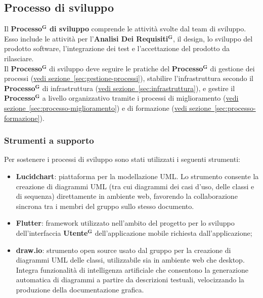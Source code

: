 \documentclass[a4paper,12pt]{article}
\newcommand{\term}[1]{\textbf{#1}$^\mathbf{G}$}
\begin{document}
\subsection{Processo di sviluppo} \label{sec:processo-sviluppo}
Il \textbf{\term{Processo} di sviluppo} comprende le attività svolte dal team di sviluppo. Esso include le attività per l'\term{Analisi Dei Requisiti}, il design, lo sviluppo del prodotto software, l'integrazione dei test e l'accettazione del prodotto da rilasciare.
\\Il \term{Processo} di sviluppo deve seguire le pratiche del \term{Processo} di gestione dei processi (\hyperref[sec:gestione-processi]{vedi sezione~\ref*{sec:gestione-processi}}), stabilire l'infrastruttura secondo il \term{Processo} di infrastruttura (\hyperref[sec:infrastruttura]{vedi sezione~\ref*{sec:infrastruttura}}), e gestire il \term{Processo} a livello organizzativo tramite i processi di miglioramento (\hyperref[sec:processo-miglioramento]{vedi sezione~\ref*{sec:processo-miglioramento}}) e di formazione (\hyperref[sec:processo-formazione]{vedi sezione~\ref*{sec:processo-formazione}}).

\subsubsection{Strumenti a supporto}
Per sostenere i processi di sviluppo sono stati utilizzati i seguenti strumenti:
\begin{itemize}
    \item \textbf{Lucidchart}: piattaforma per la modellazione UML. Lo strumento consente la creazione di diagrammi UML (tra cui diagrammi dei casi d'uso, delle classi e di sequenza) direttamente in ambiente web, favorendo la collaborazione sincrona tra i membri del gruppo sullo stesso documento.
    \item \textbf{Flutter}: framework utilizzato nell'ambito del progetto per lo sviluppo dell'interfaccia \term{Utente} dell'applicazione mobile richiesta dall'applicazione;
    \item \textbf{draw.io}: strumento open source usato dal gruppo per la creazione di diagrammi UML delle classi, utilizzabile sia in ambiente web che desktop. Integra funzionalità di intelligenza artificiale che consentono la generazione automatica di diagrammi a partire da descrizioni testuali, velocizzando la produzione della documentazione grafica.
\end{itemize}
\end{document}
